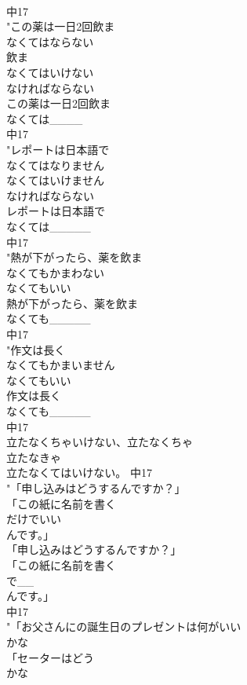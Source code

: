 \documentclass[8pt]{extreport}
\begin{document}
\begin{CJK}{UTF8}{min}
\\	中17
\\	"この薬は一日2回飲ま
\\	なくてはならない
\\	飲ま
\\	なくてはいけない
\\	なければならない	
\\	この薬は一日2回飲ま
\\	なくては____
\\	中17
\\	"レポートは日本語で
\\	なくてはなりません
\\	なくてはいけません
\\	なければならない	
\\	レポートは日本語で
\\	なくては_____
\\	中17
\\	"熱が下がったら、薬を飲ま
\\	なくてもかまわない
\\	なくてもいい	
\\	熱が下がったら、薬を飲ま
\\	なくても_____
\\	中17
\\	"作文は長く
\\	なくてもかまいません
\\	なくてもいい	
\\	作文は長く
\\	なくても_____
\\	中17
\\	立たなくちゃいけない、立たなくちゃ
\\	立たなきゃ
\\	立たなくてはいけない。 			中17
\\	"「申し込みはどうするんですか？」
\\	「この紙に名前を書く
\\	だけでいい
\\	んです。」
\\	「申し込みはどうするんですか？」
\\	「この紙に名前を書く
\\	で__
\\	んです。」
\\	中17
\\	"「お父さんにの誕生日のプレゼントは何がいい
\\	かな
\\	「セーターはどう
\\	かな

\end{CJK}
\end{document}
